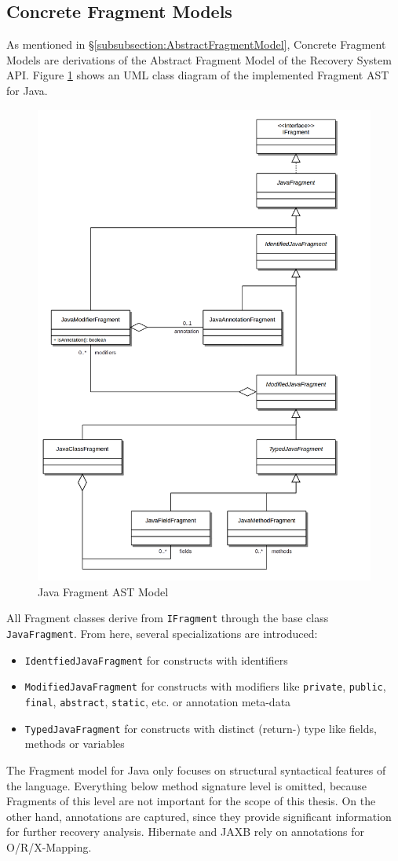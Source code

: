 \subsection{Concrete Fragment Models}
\label{subsection:ConcreteFragmentModels}
As mentioned in §\ref{subsubsection:AbstractFragmentModel}, Concrete \Gls{Fragment} Models are derivations of the Abstract Fragment Model of the Recovery System \gls{API}.
Figure \ref{figure:JavaFragmentASTModel} shows an \gls{UML} class diagram of the implemented \Gls{Fragment} \gls{AST} for \gls{Java}.
\begin{figure}[h!]
\begin{center}
\includegraphics[width=.7\textwidth]{images/JavaFragmentModel.png}
\end{center}
\caption{Java Fragment AST Model}
\label{figure:JavaFragmentASTModel}
\end{figure}
All \gls{Fragment} classes derive from \texttt{IFragment} through the base class \texttt{JavaFragment}.
From here, several specializations are introduced:
\begin{itemize}
\item
\texttt{IdentfiedJavaFragment} for constructs with identifiers
\item
\texttt{ModifiedJavaFragment} for constructs with modifiers like \texttt{private}, \texttt{public}, \texttt{final}, \texttt{abstract}, \texttt{static}, etc. or annotation meta-data
\item
\texttt{TypedJavaFragment} for constructs with distinct (return-) type like fields, methods or variables
\end{itemize}
The \gls{Fragment} model for \gls{Java} only focuses on structural syntactical features of the language.
Everything below method signature level is omitted, because \glspl{Fragment} of this level are not important for the scope of this thesis.
On the other hand, annotations are captured, since they provide significant information for further recovery analysis.
\gls{Hibernate} and \gls{JAXB} rely on annotations for \gls{O/R/X-Mapping}.

